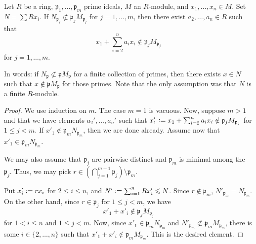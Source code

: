 \begin{prop} \label{prop:gen-prime-avoidance}
	Let $R$ be a ring, $\mathfrak{p}_{1}, \ldots, \mathfrak{p}_{m}$ prime ideals, $M$ an $R$-module, and $x_{1}, \ldots, x_{n} \in M$. Set $N = \sum R x_{i}$. If $N_{\mathfrak{p}_{j}} \not\subset \mathfrak{p}_{j} M_{\mathfrak{p}_{j}}$ for $j = 1, \ldots, m$, then there exist $a_{2}, \ldots, a_{n} \in R$ such that 
	\begin{equation*} 
		x_{1} + \sum_{i = 2}^{n} a_{i} x_{i} \notin \mathfrak{p}_{j} M_{\mathfrak{p}_{j}}
	\end{equation*}
	for $j = 1, \ldots, m$.
\end{prop}
In words: if $N_{\mathfrak{p}} \not\subset \mathfrak{p} M_{\mathfrak{p}}$ for a finite collection of primes, then there exists $x \in N$ such that $x \notin \mathfrak{p} M_{\mathfrak{p}}$ for those primes. Note that the only assumption was that $N$ is a finite $R$-module.
\begin{proof} 
	We use induction on $m$. The case $m = 1$ is vacuous. Now, suppose $m > 1$ and that we have elements $a_{2}', \ldots, a_{n}'$ such that $x'_{1} \vcentcolon= x_{1} + \sum_{i = 2}^{n} a_{i} x_{i} \notin \mathfrak{p}_{j} M_{\mathfrak{p}_{j}}$ for $1 \le j < m$. If $x'_{1} \notin \mathfrak{p}_{m} N_{\mathfrak{p}_{m}}$, then we are done already. Assume now that $x'_{1} \in \mathfrak{p}_{m} N_{\mathfrak{p}_{m}}$.

	We may also assume that $\mathfrak{p}_{j}$ are pairwise distinct and $\mathfrak{p}_{m}$ is minimal among the $\mathfrak{p}_{j}$. Thus, we may pick $r \in (\bigcap_{j = 1}^{m - 1} \mathfrak{p}_{j}) \setminus \mathfrak{p}_{m}$.

	Put $x'_{i} \vcentcolon= r x_{i}$ for $2 \le i \le n$, and $N' \vcentcolon= \sum_{i = 1}^{n} R x'_{i} \le N$. Since $r \notin \mathfrak{p}_{m}$, $N'_{\mathfrak{p}_{m}} = N_{\mathfrak{p}_{m}}$. \newline
	On the other hand, since $r \in \mathfrak{p}_{j}$ for $1 \le j < m$, we have
	\begin{equation*} 
		x'_{1} + x'_{i} \notin \mathfrak{p}_{j} M_{\mathfrak{p}_{j}}
	\end{equation*}
	for $1 < i \le n$ and $1 \le j < m$. Now, since $x'_{1} \in \mathfrak{p}_{m} N_{\mathfrak{p}_{m}}$ and $N'_{\mathfrak{p}_{m}} \not\subset \mathfrak{p}_{m} M_{\mathfrak{p}_{m}}$, there is some $i \in \{2, \ldots, n\}$ such that $x'_{1} + x'_{i} \notin \mathfrak{p}_{m} M_{\mathfrak{p}_{m}}$. This is the desired element.
\end{proof}

